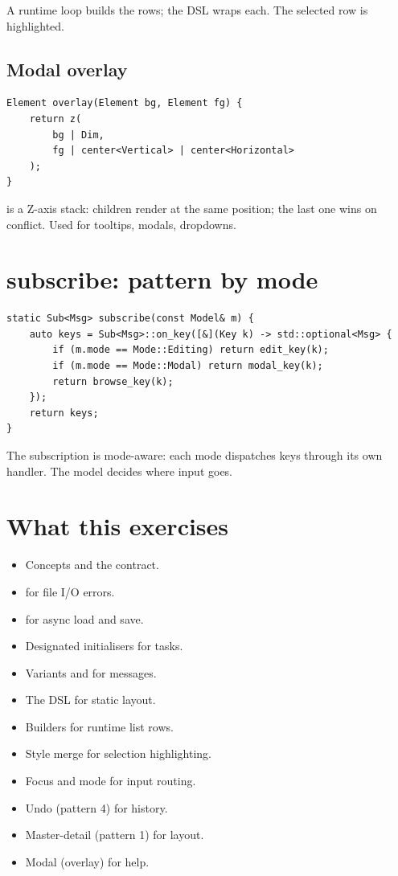 A runtime loop builds the rows; the DSL wraps each. The
selected row is highlighted.

\subsection*{Modal overlay}

\begin{lstlisting}
Element overlay(Element bg, Element fg) {
    return z(
        bg | Dim,
        fg | center<Vertical> | center<Horizontal>
    );
}
\end{lstlisting}

 is a Z-axis stack: children render at the same
position; the last one wins on conflict. Used for tooltips,
modals, dropdowns.

\section{subscribe: pattern by mode}

\begin{lstlisting}
static Sub<Msg> subscribe(const Model& m) {
    auto keys = Sub<Msg>::on_key([&](Key k) -> std::optional<Msg> {
        if (m.mode == Mode::Editing) return edit_key(k);
        if (m.mode == Mode::Modal) return modal_key(k);
        return browse_key(k);
    });
    return keys;
}
\end{lstlisting}

The subscription is mode-aware: each mode dispatches keys
through its own handler. The model decides where input goes.

\section{What this exercises}

\begin{itemize}[leftmargin=*]
  \item Concepts and the  contract.
  \item {} for file I/O errors.
  \item {} for async load and save.
  \item Designated initialisers for tasks.
  \item Variants and  for messages.
  \item The DSL for static layout.
  \item Builders for runtime list rows.
  \item Style merge for selection highlighting.
  \item Focus and mode for input routing.
  \item Undo (pattern 4) for history.
  \item Master-detail (pattern 1) for layout.
  \item Modal (overlay) for help.
\end{itemize}

